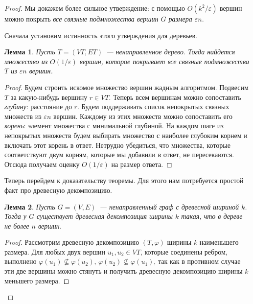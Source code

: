 \documentclass[12pt]{article}
\newcommand{\eps}{\varepsilon}
\newtheorem{lemma}{Лемма}
\begin{document}
    \begin{proof}
        Мы докажем более сильное утверждение:
        с помощью $O(k^2 / \eps)$ вершин можно покрыть \emph{все связные подмножества вершин $G$ размера $\eps n$}.

        Сначала установим истинность этого утверждения для деревьев.
        \begin{lemma}
            \label{tree_epsilon_net}
            Пусть $T = (VT, ET)$~--- ненаправленное дерево. Тогда найдется множество из $O(1 / \eps)$ вершин, которое
            покрывает все связные подмножества $T$ из $\eps n$ вершин.
        \end{lemma}
        \begin{proof}
            Будем строить искомое множество вершин жадным алгоритмом.
            Подвесим $T$ за какую-нибудь вершину $r \in VT$.         
            Теперь всем вершинам можно сопоставить \emph{глубину}: расстояние до $r$.
            Будем поддерживать список непокрытых связных множеств из $\eps n$ вершин.
            Каждому из этих множеств можно сопоставить его \emph{корень}: элемент множества с минимальной глубиной.
            На каждом шаге из непокрытых множеств будем выбирать множество с наиболее глубоким корнем и включать этот
            корень в ответ.
            Нетрудно убедиться, что множества, которые соответствуют двум корням, которые мы добавили в ответ,
            не пересекаются. Отсюда получаем оценку $O(1 / \eps)$ на размер ответа.
        \end{proof}

        Теперь перейдем к доказательству теоремы. Для этого нам потребуется простой факт про древесную декомпозицию.
        \begin{lemma}
            \label{moderate_decomposition}
            Пусть $G = (V, E)$~--- ненаправленный граф с древесной шириной $k$. Тогда у $G$ существует древесная
            декомпозиция ширины $k$ такая, что в дереве не более $n$ вершин.
        \end{lemma}
        \begin{proof}
            Рассмотрим древесную декомпозицию $(T, \varphi)$ ширины $k$ наименьшего размера. Для любых двух
            вершин $u_1, u_2 \in VT$, которые соединены ребром, выполнено $\varphi(u_1) \not \subseteq \varphi(u_2)$,
            $\varphi(u_2) \not \subseteq \varphi(u_1)$, так как в противном случае эти две вершины можно стянуть
            и получить древесную декомпозицию ширины $k$ меньшего размера.


\end{proof}
\end{proof}
\end{document}
